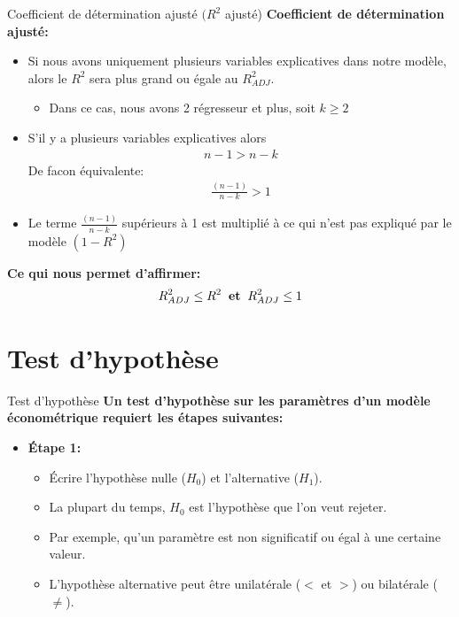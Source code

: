 \documentclass{beamer}
\begin{document}
\begin{frame}{Coefficient de détermination ajusté $(R^2$ ajusté)}
\textbf{Coefficient de détermination ajusté:}

\begin{itemize}
\item Si nous avons uniquement plusieurs variables explicatives dans notre modèle, alors le $R^2$ sera plus grand ou égale au $R_{ADJ}^2$.
\begin{itemize}
\item Dans ce cas, nous avons 2 régresseur et plus, soit $k \ge 2$
\end{itemize}
\item S'il y a plusieurs variables explicatives alors
\begin{align*}
n-1 > n-k
\end{align*}
De facon équivalente:
\begin{align*}
\frac{(n-1)}{n-k} > 1
\end{align*}
\item Le terme $\frac{(n-1)}{n-k}$ supérieurs à 1  est multiplié à ce qui n'est pas expliqué par le modèle $(1-R^2)$
\end{itemize}
\textbf{Ce qui nous permet d'affirmer:}
\begin{align*}
R_{ADJ}^2 \leq R^2 \hspace{0.2cm} \textbf{et} \hspace{0.2cm} R_{ADJ}^2 \leq 1
\end{align*}
\end{frame}



\section{Test d'hypothèse}

\frame{\tableofcontents[current]}

\begin{frame}{Test d'hypothèse}
\textbf{Un test d’hypothèse sur les paramètres d’un modèle économétrique requiert les
 étapes suivantes:}

\begin{itemize}
\item \textbf{Étape 1:} 
\begin{itemize}
\item Écrire l’hypothèse nulle ($H_0$) et l’alternative ($H_1$). 
\item La plupart du temps, $H_0$ est l’hypothèse que l’on veut rejeter. 
\item Par exemple, qu’un paramètre est non significatif ou égal à une certaine valeur. 
\item L’hypothèse alternative peut être unilatérale ($<$ et $>$) ou bilatérale ($\neq$).
\end{itemize}
\end{itemize}
\end{frame}
\end{document}
